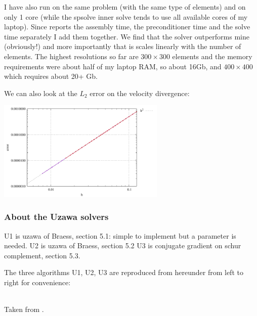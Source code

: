 I have also run \aspect on the same problem (with the same type of elements) and on only 
1 core (while the spsolve inner solve tends to use all available cores of my laptop). 
Since \aspect reports the assembly time, the preconditioner time and the solve
time separately I add them together.
We find that the solver outperforms mine (obviously!) and more importantly that 
is scales linearly with the number of elements. 
The highest resolutions so far are $300\times 300$ elements and the memory requirements 
were about half of my laptop RAM, so about 16Gb, and $400\times 400$ which requires
about 20+ Gb.


We can also look at the $L_2$ error on the velocity divergence:

\begin{center}
\includegraphics[width=8cm]{python_codes/fieldstone_147/RESULTS/error_divv.pdf}
\end{center}

\newpage
\subsubsection*{About the Uzawa solvers}

U1 is uzawa of Braess, section 5.1: simple to implement but a parameter is needed. 
U2 is uzawa of Braess, section 5.2
U3 is conjugate gradient on schur complement, section 5.3.

The three algorithms U1, U2, U3 are reproduced from \cite{braess} hereunder from left to right for convenience:
\begin{center}
\\
Taken from \textcite{braess}.
\end{center}

